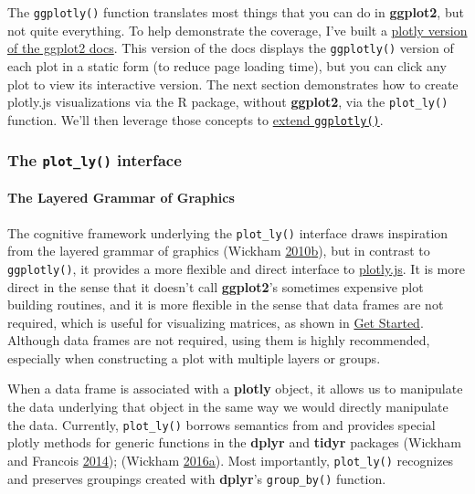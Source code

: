 \documentclass[12pt,]{isuthesis}
\let\oldparagraph\paragraph
\renewcommand{\paragraph}[1]{\oldparagraph{#1}\mbox{}}
\begin{document}
The \texttt{ggplotly()} function translates most things that you can do
in \textbf{ggplot2}, but not quite everything. To help demonstrate the
coverage, I've built a
\href{http://ropensci.github.io/plotly/ggplot2}{plotly version of the
ggplot2 docs}. This version of the docs displays the \texttt{ggplotly()}
version of each plot in a static form (to reduce page loading time), but
you can click any plot to view its interactive version. The next section
demonstrates how to create plotly.js visualizations via the R package,
without \textbf{ggplot2}, via the \texttt{plot\_ly()} function. We'll
then leverage those concepts to
\protect\hyperlink{extending-ggplotly}{extend \texttt{ggplotly()}}.

\subsubsection{\texorpdfstring{The \texttt{plot\_ly()}
interface}{The plot\_ly() interface}}\label{the-plot_ly-interface}

\hypertarget{the-layered-grammar-of-graphics}{\paragraph{The Layered
Grammar of Graphics}\label{the-layered-grammar-of-graphics}}

The cognitive framework underlying the \texttt{plot\_ly()} interface
draws inspiration from the layered grammar of graphics (Wickham
\protect\hyperlink{ref-Wickham:2010hya}{2010}\protect\hyperlink{ref-Wickham:2010hya}{b}),
but in contrast to \texttt{ggplotly()}, it provides a more flexible and
direct interface to
\href{https://github.com/plotly/plotly.js}{plotly.js}. It is more direct
in the sense that it doesn't call \textbf{ggplot2}'s sometimes expensive
plot building routines, and it is more flexible in the sense that data
frames are not required, which is useful for visualizing matrices, as
shown in \protect\hyperlink{get-started}{Get Started}. Although data
frames are not required, using them is highly recommended, especially
when constructing a plot with multiple layers or groups.

When a data frame is associated with a \textbf{plotly} object, it allows
us to manipulate the data underlying that object in the same way we
would directly manipulate the data. Currently, \texttt{plot\_ly()}
borrows semantics from and provides special plotly methods for generic
functions in the \textbf{dplyr} and \textbf{tidyr} packages (Wickham and
Francois \protect\hyperlink{ref-dplyr}{2014}); (Wickham
\protect\hyperlink{ref-tidyr}{2016}\protect\hyperlink{ref-tidyr}{a}).
Most importantly, \texttt{plot\_ly()} recognizes and preserves groupings
created with \textbf{dplyr}'s \texttt{group\_by()} function.
\end{document}
